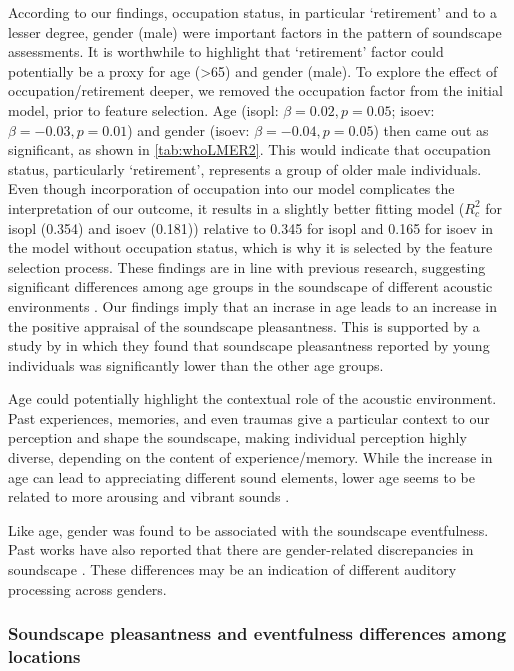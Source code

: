 According to our findings, occupation status, in particular `retirement' and to a lesser degree, gender (male) were important factors in the pattern of soundscape assessments. It is worthwhile to highlight that `retirement' factor could potentially be a proxy for age (>65) and gender (male). To explore the effect of occupation/retirement deeper, we removed the occupation factor from the initial model, prior to feature selection. Age (\gls{isopl}: $\beta=0.02, p=0.05$; \gls{isoev}: $\beta=-0.03, p=0.01$) and gender (\gls{isoev}: $\beta=-0.04, p=0.05$) then came out as significant, as shown in \cref{tab:whoLMER2}. This would indicate that occupation status, particularly `retirement', represents a group of older male individuals. Even though incorporation of occupation into our model complicates the interpretation of our outcome, it results in a slightly better fitting model ($R^2_c$ for \gls{isopl} (0.354) and \gls{isoev} (0.181)) relative to 0.345 for \gls{isopl} and 0.165 for \gls{isoev} in the model without occupation status, which is why it is selected by the feature selection process. These findings are in line with previous research, suggesting significant differences among age groups in the soundscape of different acoustic environments  \citep{Yang2005Acoustic}. Our findings imply that an incrase in age leads to an increase in the positive appraisal of the soundscape pleasantness. This is supported by a study by  in which they found that soundscape pleasantness reported by young individuals was significantly lower than the other age groups. 

Age could potentially highlight the contextual role of the acoustic environment. Past experiences, memories, and even traumas give a particular context to our perception and shape the soundscape, making individual perception highly diverse, depending on the content of experience/memory. While the increase in age can lead to appreciating different sound elements, lower age seems to be related to more arousing and vibrant sounds \citep{Yang2005Acoustic}.

Like age, gender was found to be associated with the soundscape eventfulness. Past works have also reported that there are gender-related discrepancies in soundscape  \citep{Yang2005Acoustic}. These differences may be an indication of different auditory processing across genders.

\subsubsection*{Soundscape pleasantness and eventfulness differences among locations}


